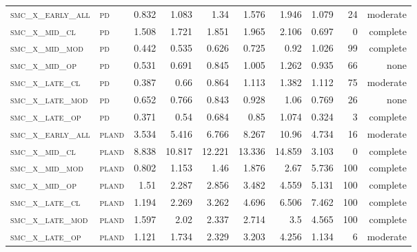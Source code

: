 \begin{landscape}
\begin{center}
\begin{footnotesize}
\begin{longtable}{llrrrrr|rrr}
\textsc{smc\_x\_early\_all} & \textsc{pd        }   & 0.832      & 1.083      & 1.34       & 1.576      & 1.946      & 1.079      & 24    & moderate   \\
\textsc{smc\_x\_mid\_cl   } & \textsc{pd        }   & 1.508      & 1.721      & 1.851      & 1.965      & 2.106      & 0.697      & 0     & complete   \\
\textsc{smc\_x\_mid\_mod  } & \textsc{pd        }   & 0.442      & 0.535      & 0.626      & 0.725      & 0.92       & 1.026      & 99    & complete   \\
\textsc{smc\_x\_mid\_op   } & \textsc{pd        }   & 0.531      & 0.691      & 0.845      & 1.005      & 1.262      & 0.935      & 66    & none   \\
\textsc{smc\_x\_late\_cl  } & \textsc{pd        }   & 0.387      & 0.66       & 0.864      & 1.113      & 1.382      & 1.112      & 75    & moderate   \\
\textsc{smc\_x\_late\_mod } & \textsc{pd        }   & 0.652      & 0.766      & 0.843      & 0.928      & 1.06       & 0.769      & 26    & none   \\
\textsc{smc\_x\_late\_op  } & \textsc{pd        }   & 0.371      & 0.54       & 0.684      & 0.85       & 1.074      & 0.324      & 3     & complete   \\
\textsc{smc\_x\_early\_all} & \textsc{pland     }   & 3.534      & 5.416      & 6.766      & 8.267      & 10.96      & 4.734      & 16    & moderate   \\
\textsc{smc\_x\_mid\_cl   } & \textsc{pland     }   & 8.838      & 10.817     & 12.221     & 13.336     & 14.859     & 3.103      & 0     & complete   \\
\textsc{smc\_x\_mid\_mod  } & \textsc{pland     }   & 0.802      & 1.153      & 1.46       & 1.876      & 2.67       & 5.736      & 100   & complete   \\
\textsc{smc\_x\_mid\_op   } & \textsc{pland     }   & 1.51       & 2.287      & 2.856      & 3.482      & 4.559      & 5.131      & 100   & complete   \\
\textsc{smc\_x\_late\_cl  } & \textsc{pland     }   & 1.194      & 2.269      & 3.262      & 4.696      & 6.506      & 7.462      & 100   & complete   \\
\textsc{smc\_x\_late\_mod } & \textsc{pland     }   & 1.597      & 2.02       & 2.337      & 2.714      & 3.5        & 4.565      & 100   & complete   \\
\textsc{smc\_x\_late\_op  } & \textsc{pland     }   & 1.121      & 1.734      & 2.329      & 3.203      & 4.256      & 1.134      & 6     & moderate   \\

\end{longtable}
\end{footnotesize}
\end{center}
\end{landscape}
